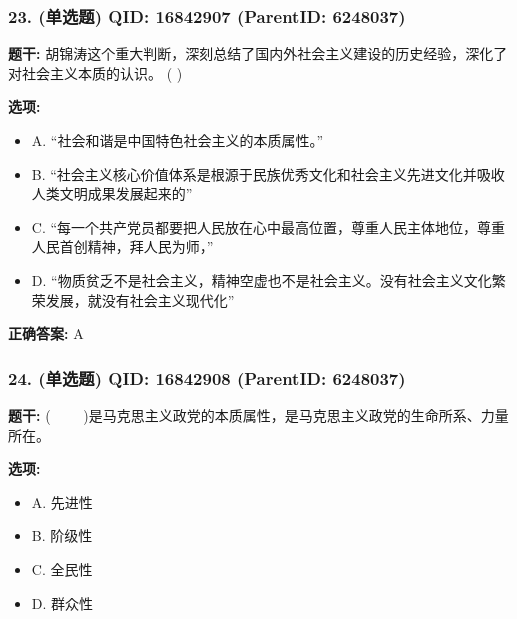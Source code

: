 \documentclass[12pt,UTF8]{ctexart}
\begin{document}
\subsubsection*{23. (单选题) \small QID: 16842907 (ParentID: 6248037)}

\textbf{题干:}
胡锦涛这个重大判断，深刻总结了国内外社会主义建设的历史经验，深化了对社会主义本质的认识。 ( )



\textbf{选项:}
\begin{itemize}[leftmargin=*]

  \item A. “社会和谐是中国特色社会主义的本质属性。”

  \item B. “社会主义核心价值体系是根源于民族优秀文化和社会主义先进文化并吸收人类文明成果发展起来的”

  \item C. “每一个共产党员都要把人民放在心中最高位置，尊重人民主体地位，尊重人民首创精神，拜人民为师，”

  \item D. “物质贫乏不是社会主义，精神空虚也不是社会主义。没有社会主义文化繁荣发展，就没有社会主义现代化”

\end{itemize}

\textbf{正确答案:}
A

\vspace{0.3em}\hrulefill\vspace{0.7em}

\subsubsection*{24. (单选题) \small QID: 16842908 (ParentID: 6248037)}

\textbf{题干:}
(     )是马克思主义政党的本质属性，是马克思主义政党的生命所系、力量所在。



\textbf{选项:}
\begin{itemize}[leftmargin=*]

  \item A. 先进性

  \item B. 阶级性

  \item C. 全民性

  \item D. 群众性

\end{itemize}
\end{document}
